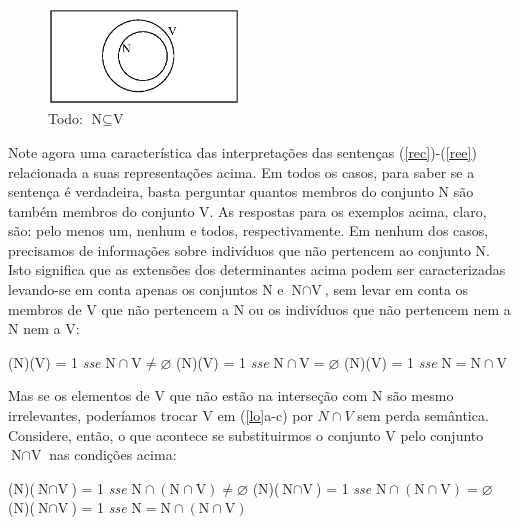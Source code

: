 \begin{figure}[H]
\centerline{\includegraphics[width=12pc]{figures/todo.eps}} \caption{Todo:
$\text{N}\subseteq\text{V}$}
\end{figure}

\n Note agora uma característica das interpretações das sentenças
(\ref{rec})-(\ref{ree}) relacionada a suas representações acima.
Em todos os casos, para saber se a sentença é verdadeira, basta
perguntar quantos membros do conjunto N são também membros do
conjunto V. As respostas para os exemplos acima, claro, são: pelo
menos um, nenhum e todos, respectivamente. Em nenhum dos casos,
precisamos de informações sobre indivíduos que não pertencem ao
conjunto N. Isto significa que as extensões dos determinantes
acima podem ser caracterizadas levando-se em conta apenas os
conjuntos N e $\text{N}\cap\text{V}$, sem levar em conta os
membros de V que não pertencem a N ou os indivíduos que não
pertencem nem a N nem a V:


\begin{exe}
    \ex\label{lo}
    \begin{xlist}
        \ex  {}(N)(V) = 1 \textit{sse}
            $\text{N}\cap\text{V}\neq\varnothing$\label{loa}
        \ex  {}(N)(V) = 1 \textit{sse}
            $\text{N}\cap\text{V}=\varnothing$\label{loz}
        \ex  {}(N)(V) = 1 \textit{sse}
            $\text{N}=\text{N}\cap\text{V}$\label{loc}
    \end{xlist}
\end{exe}

\n Mas se os elementos de V que não estão na interseção com N são mesmo irrelevantes, poderíamos trocar V em (\ref{lo}a-c) por $N \cap V$ sem perda semântica. Considere, então, o que acontece se substituirmos o conjunto V
pelo conjunto $\text{N}\cap\text{V}$ nas condições acima:


\begin{exe}
    \ex\label{clu}
    \begin{xlist}
        \ex  {}(N)($\text{N}\cap\text{V}$) = 1 \textit{sse}
            $\text{N}\cap (\text{N}\cap\text{V})\neq\varnothing$\label{clua}
        \ex  {}(N)($\text{N}\cap\text{V}$) = 1 \textit{sse}
            $\text{N}\cap (\text{N}\cap\text{V})=\varnothing $\label{cluz}
        \ex  {}(N)($\text{N}\cap\text{V}$) = 1 \textit{sse}
            $\text{N}=\text{N}\cap (\text{N}\cap\text{V})$\label{cluc}
    \end{xlist}
\end{exe}


